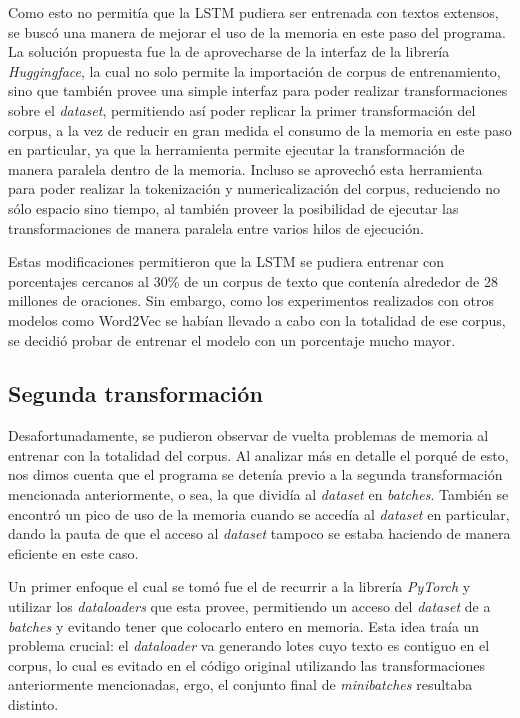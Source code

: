 Como esto no permitía que la LSTM pudiera ser entrenada con textos extensos, se buscó una manera de mejorar el uso de la memoria en este paso del programa. La solución propuesta fue la de aprovecharse de la interfaz de la librería \textit{Huggingface}, la cual no solo permite la importación de corpus de entrenamiento, sino que también provee una simple interfaz para poder realizar transformaciones sobre el \textit{dataset}, permitiendo así poder replicar la primer transformación del corpus, a la vez de reducir en gran medida el consumo de la memoria en este paso en particular, ya que la herramienta permite ejecutar la transformación de manera paralela dentro de la memoria. Incluso se aprovechó esta herramienta para poder realizar la tokenización y numericalización del corpus, reduciendo no sólo espacio sino tiempo, al también proveer la posibilidad de ejecutar las transformaciones de manera paralela entre varios hilos de ejecución.

Estas modificaciones permitieron que la LSTM se pudiera entrenar con porcentajes cercanos al 30\% de un corpus de texto que contenía alrededor de 28 millones de oraciones. Sin embargo, como los experimentos realizados con otros modelos como Word2Vec se habían llevado a cabo con la totalidad de ese corpus, se decidió probar de entrenar el modelo con un porcentaje mucho mayor.

\subsection{Segunda transformación}

Desafortunadamente, se pudieron observar de vuelta problemas de memoria al entrenar con la totalidad del corpus. Al analizar más en detalle el porqué de esto, nos dimos cuenta que el programa se detenía previo a la segunda transformación mencionada anteriormente, o sea, la que dividía al \textit{dataset} en \textit{batches}. También se encontró un pico de uso de la memoria cuando se accedía al \textit{dataset} en particular, dando la pauta de que el acceso al \textit{dataset} tampoco se estaba haciendo de manera eficiente en este caso.

Un primer enfoque el cual se tomó fue el de recurrir a la librería \textit{PyTorch} y utilizar los \textit{dataloaders} que esta provee, permitiendo un acceso del \textit{dataset} de a \textit{batches} y evitando tener que colocarlo entero en memoria. Esta idea traía un problema crucial: el \textit{dataloader} va generando lotes cuyo texto es contiguo en el corpus, lo cual es evitado en el código original utilizando las transformaciones anteriormente mencionadas, ergo, el conjunto final de \textit{minibatches} resultaba distinto.

